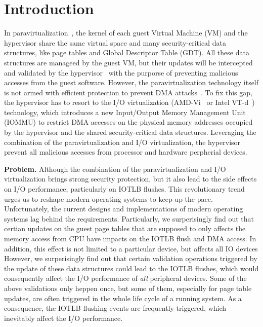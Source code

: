 \section{Introduction} \label{sec:intro}
In paravirtualization~\cite{XEN-SOSP03,denali-paravirtualization}, the kernel of each guest Virtual Machine (VM) and the hypervisor share the same virtual space and many security-critical data structures, like page tables and Global Descriptor Table (GDT). All these data structures are manageed by the guest VM, but their updates will be intercepted and validated by the hypervisor~\cite{XEN-SOSP03} with the purporse of preventing malicious accesses from the guest software.
However, the paravirtualization technology itself is not armed with efficient protection to prevent DMA attacks~\cite{disaggregation}.
To fix this gap, the hypervisor has to resort to the I/O virtualization (AMD-Vi~\cite{amdvt} or Intel VT-d~\cite{intelvt}) technology, which introduces a new Input/Output Memory Management Unit (IOMMU) to restrict DMA accesses on the physical memory addresses occupied by the hypervisor and the shared security-critical data structures. 
Leveraging the combination of the paravirtualization and I/O virtualization, the hypervisor prevent all malicious accesses from processor and hardware perpherial devices.

\textbf{Problem.} Although the combination of the paravirtualization and I/O virtualization brings strong security protection, but it also lead to the side effects on I/O performance, particularly on IOTLB flushes. 
This revolutionary trend urges us to reshape modern operating systems to keep up the pace. Unfortunately, the current designs and implementations of modern operating systems lag behind the requirements.
Particularly, we surperisingly find out that certian updates on the guest page tables that are supposed to only affects the memory access from CPU have impacts on the IOTLB flush and DMA access. 
In addition, this effect is not limited to a particular device, but affects all IO devices
However, we surperisingly find out that certain validation operations triggered by the update of these data structures could lead to the IOTLB flushes, which would consequently affect the I/O performance of \emph{all} peripheral devices.
Some of the above validations only heppen once, but some of them, especially for page table updates, are often triggered in the whole life cycle of a running system. 
As a consequence, the IOTLB flushing events are frequently triggered, which inevitably affect the I/O performance.

